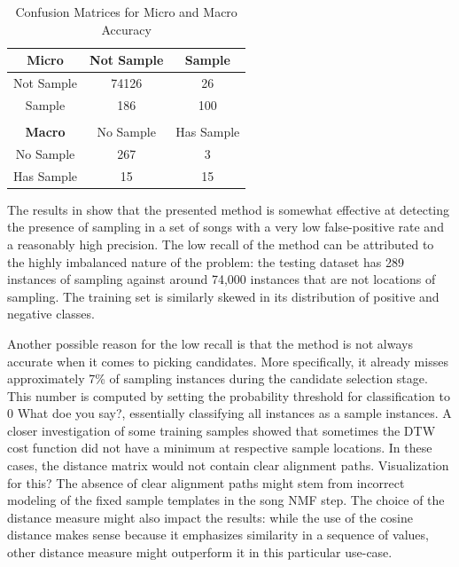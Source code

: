 \documentclass{article}
\begin{document}
\begin{table}[t]
\centering
\caption{Confusion Matrices for Micro and Macro Accuracy}
\label{conf_mat}
\begin{tabular}{ccc}
\hline
\multicolumn{1}{|c|}{\textbf{Micro}} & \multicolumn{1}{c|}{Not Sample} & \multicolumn{1}{c|}{Sample}     \\ \hline
\multicolumn{1}{|c|}{Not Sample}     & \multicolumn{1}{c|}{74126}      & \multicolumn{1}{c|}{26}         \\ \hline
\multicolumn{1}{|c|}{Sample}         & \multicolumn{1}{c|}{186}        & \multicolumn{1}{c|}{100}        \\ \hline
                                     &                                 &                                 \\ \hline
\multicolumn{1}{|c|}{\textbf{Macro}} & \multicolumn{1}{c|}{No Sample}  & \multicolumn{1}{c|}{Has Sample} \\ \hline
\multicolumn{1}{|c|}{No Sample}      & \multicolumn{1}{c|}{267}        & \multicolumn{1}{c|}{3}          \\ \hline
\multicolumn{1}{|c|}{Has Sample}     & \multicolumn{1}{c|}{15}         & \multicolumn{1}{c|}{15}         \\ \hline
\end{tabular}
\end{table}

The results in  show that the presented method is somewhat effective at detecting the presence of sampling in a set of songs with a very low false-positive rate and a reasonably high precision. The low recall of the method can be attributed to the highly imbalanced nature of the problem: the testing dataset has 289 instances of sampling against around 74,000 instances that are not locations of sampling. The training set is similarly skewed in its distribution of positive and negative classes. %

Another possible reason for the low recall is that the method is not always accurate when it comes to picking candidates. More specifically, it already misses approximately 7\% of sampling instances during the candidate selection stage. This number is computed by setting the probability threshold for classification to 0 {\color{red} What doe you say?}, essentially classifying all instances as a sample instances. A closer investigation of some training samples showed that sometimes the DTW cost function did not have a minimum at respective sample locations. In these cases, the distance matrix would not contain clear alignment paths. {\color{red} Visualization for this?} %
%
The absence of clear alignment paths might stem from incorrect modeling of the fixed sample templates in the song NMF step. The choice of the distance measure might also impact the results: while the use of the cosine distance makes sense because it emphasizes similarity in a sequence of values, other distance measure might outperform it in this particular use-case.
\end{document}
